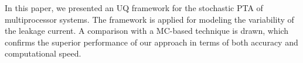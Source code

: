 In this paper, we presented an UQ framework for the stochastic PTA of multiprocessor systems. The framework is applied for modeling the variability of the leakage current. A comparison with a MC-based technique is drawn, which confirms the superior performance of our approach in terms of both accuracy and computational speed.
